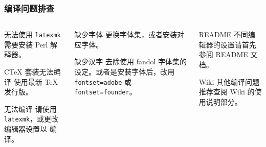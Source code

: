 \begin{frame}[label=compile]
  \frametitle{编译问题排查}
  \begin{columns}
    \begin{column}{0.33\textwidth}
      \begin{alertblock}{无法使用 \texttt{latexmk}}
         需要安装 Perl 解释器。
      \end{alertblock}  
      \begin{alertblock}{C\TeX{} 套装无法编译}
        使用最新 \TeX{} 发行版。
      \end{alertblock}
      \begin{alertblock}{ 无法编译}
        请使用 \texttt{latexmk}，或更改编辑器设置以  编译。
      \end{alertblock}
    \end{column}
    \begin{column}{0.33\textwidth}
      \begin{alertblock}{缺少字体 }
        更换字体集，或者安装对应字体。
      \end{alertblock}
      \begin{alertblock}{缺少汉字 }
        去除使用 fandol 字体集的设定。或者是安装字体后，改用 \texttt{fontset=adobe} 或 \texttt{fontset=founder}。
      \end{alertblock}
    \end{column}
    \begin{column}{0.33\textwidth}
      \begin{block}{\faInfoCircle{} README}
        不同编辑器的设置请首先参阅 README  文档。
      \end{block}
      \begin{block}{\faBookOpen{} Wiki}
        其他编译问题推荐查阅 Wiki  的使用说明部分。
      \end{block}
    \end{column}
  \end{columns}
\end{frame}

